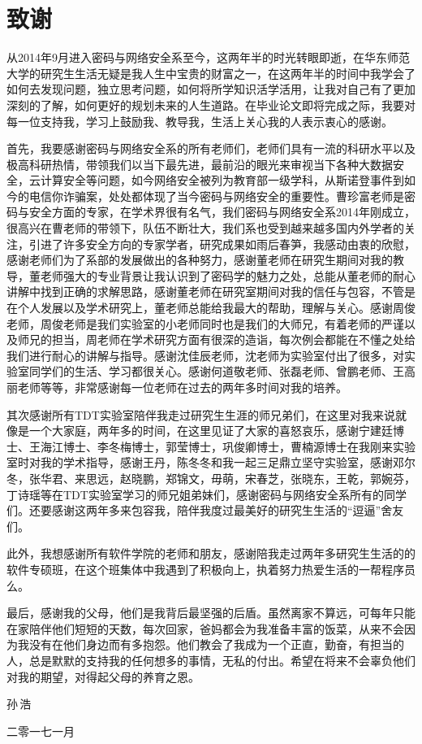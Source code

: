 {\kaishu
\chapter*{致\qquad 谢}
从2014年9月进入密码与网络安全系至今，这两年半的时光转眼即逝，在华东师范大学的研究生生活无疑是我人生中宝贵的财富之一，在这两年半的时间中我学会了如何去发现问题，独立思考问题，如何将所学知识活学活用，让我对自己有了更加深刻的了解，如何更好的规划未来的人生道路。在毕业论文即将完成之际，我要对每一位支持我，学习上鼓励我、教导我，生活上关心我的人表示衷心的感谢。

首先，我要感谢密码与网络安全系的所有老师们，老师们具有一流的科研水平以及极高科研热情，带领我们以当下最先进，最前沿的眼光来审视当下各种大数据安全，云计算安全等问题，如今网络安全被列为教育部一级学科，从斯诺登事件到如今的电信你诈骗案，处处都体现了当今密码与网络安全的重要性。曹珍富老师是密码与安全方面的专家，在学术界很有名气，我们密码与网络安全系2014年刚成立，很高兴在曹老师的带领下，队伍不断壮大，我们系也受到越来越多国内外学者的关注，引进了许多安全方向的专家学者，研究成果如雨后春笋，我感动由衷的欣慰，感谢老师们为了系部的发展做出的各种努力，感谢董老师在研究生期间对我的教导，董老师强大的专业背景让我认识到了密码学的魅力之处，总能从董老师的耐心讲解中找到正确的求解思路，感谢董老师在研究室期间对我的信任与包容，不管是在个人发展以及学术研究上，董老师总能给我最大的帮助，理解与关心。感谢周俊老师，周俊老师是我们实验室的小老师同时也是我们的大师兄，有着老师的严谨以及师兄的担当，周老师在学术研究方面有很深的造诣，每次例会都能在不懂之处给我们进行耐心的讲解与指导。感谢沈佳辰老师，沈老师为实验室付出了很多，对实验室同学们的生活、学习都很关心。感谢何道敬老师、张磊老师、曾鹏老师、王高丽老师等等，非常感谢每一位老师在过去的两年多时间对我的培养。

其次感谢所有TDT实验室陪伴我走过研究生生涯的师兄弟们，在这里对我来说就像是一个大家庭，两年多的时间，在这里见证了大家的喜怒哀乐，感谢宁建廷博士、王海江博士、李冬梅博士，郭莹博士，巩俊卿博士，曹楠源博士在我刚来实验室时对我的学术指导，感谢王丹，陈冬冬和我一起三足鼎立坚守实验室，感谢邓尔冬，张华君、来思远，赵晓鹏，郑锦文，毋萌，宋春芝，张晓东，王乾，郭婉芬，丁诗瑶等在TDT实验室学习的师兄姐弟妹们，感谢密码与网络安全系所有的同学们。还要感谢这两年多来包容我，陪伴我度过最美好的研究生生活的“逗逼”舍友们。

此外，我想感谢所有软件学院的老师和朋友，感谢陪我走过两年多研究生生活的的软件专硕班，在这个班集体中我遇到了积极向上，执着努力热爱生活的一帮程序员么。

最后，感谢我的父母，他们是我背后最坚强的后盾。虽然离家不算远，可每年只能在家陪伴他们短短的天数，每次回家，爸妈都会为我准备丰富的饭菜，从来不会因为我没有在他们身边而有多抱怨。他们教会了我成为一个正直，勤奋，有担当的人，总是默默的支持我的任何想多的事情，无私的付出。希望在将来不会辜负他们对我的期望，对得起父母的养育之恩。

\vspace{0.8cm} \hspace{9.8cm}  孙\,浩

\hspace{9cm}  二零一七一月 }
